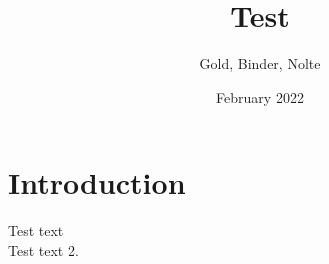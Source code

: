 \documentclass{article}
\title{Test}
\author{Gold, Binder, Nolte}
\date{February 2022}
\begin{document}
\maketitle

\section{Introduction}
Test text \\
Test text 2.
\end{document}
